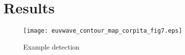 \section{Results}\label{sec:results}

\begin{figure}
\begin{center}
\texttt{[image: euvwave\_contour\_map\_corpita\_fig7.eps]}
\caption{Example detection}
\label{aware_detection_corpita_fig7}
\end{center}
\end{figure}
